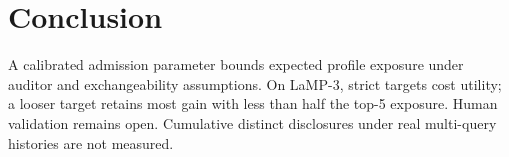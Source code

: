 \section{Conclusion}
\label{sec:conclusion}
A calibrated admission parameter bounds expected profile exposure under
auditor and exchangeability assumptions. On LaMP-3, strict targets cost
utility; a looser target retains most gain with less than half the top-5
exposure. Human validation remains open. Cumulative distinct disclosures
under real multi-query histories are not measured.
